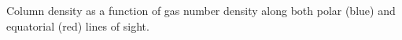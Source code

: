 Column density as a function of gas number density along both polar (blue) and equatorial (red) lines of sight.